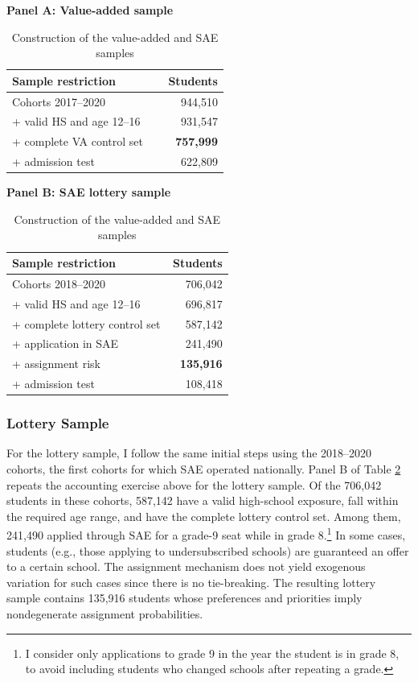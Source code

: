 \documentclass[a4paper, article, english, oneside, unknownkeysallowed, 12pt]{memoir}
\begin{document}
\begin{table}[H]
\centering
\caption{Construction of the value-added and SAE samples}
\label{tab:data-samples}
\begin{minipage}[t]{0.48\textwidth}
\centering
\textbf{Panel A: Value-added sample}\\[0.4em]
\begin{tabular}{@{}p{0.72\linewidth}r@{}}
\toprule
Sample restriction & Students \\
\midrule
Cohorts 2017--2020 & 944,510 \\
+ valid HS and age 12--16 & 931,547 \\
+ complete VA control set & \textbf{757,999} \\
+ admission test & 622,809 \\
\bottomrule
\end{tabular}
\end{minipage}
\hfill
\begin{minipage}[t]{0.48\textwidth}
\centering
\textbf{Panel B: SAE lottery sample}\\[0.4em]
\begin{tabular}{@{}p{0.72\linewidth}r@{}}
\toprule
Sample restriction & Students \\
\midrule
Cohorts 2018--2020 & 706,042 \\
+ valid HS and age 12--16 & 696,817 \\
+ complete lottery control set & 587,142 \\
+ application in SAE & 241,490 \\
+ assignment risk & \textbf{135,916} \\
+ admission test & 108,418 \\
\bottomrule
\end{tabular}
\end{minipage}
\end{table}



\subsubsection{Lottery Sample}


For the lottery sample, I follow the same initial steps using the 2018--2020 cohorts, the first cohorts for which SAE operated nationally.
Panel B of Table \ref{tab:data-samples} repeats the accounting exercise above for the lottery sample. 
Of the 706,042 students in these cohorts, 587,142 have a valid high-school exposure, fall within the required age range, and have the complete lottery control set.
Among them, 241,490 applied through SAE for a grade-9 seat while in grade 8.\footnote{I consider only applications to grade 9 in the year the student is in grade 8, to avoid including students who changed schools after repeating a grade.}
In some cases, students (e.g., those applying to undersubscribed schools) are guaranteed an offer to a certain school. 
The assignment mechanism does not yield exogenous variation for such cases since there is no tie-breaking.
The resulting lottery sample contains 135,916 students whose preferences and priorities imply nondegenerate assignment probabilities.
\end{document}
